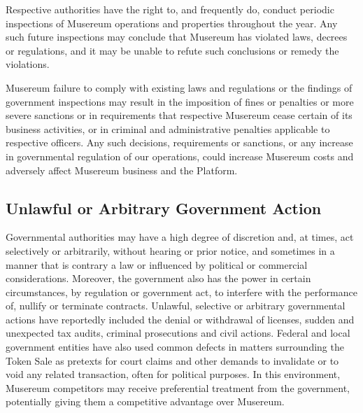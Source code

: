 \documentclass[12pt]{report}
\begin{document}
Respective authorities have the right to, and frequently do, conduct periodic inspections of Musereum operations and properties throughout the year. Any such future inspections may conclude that Musereum has violated laws, decrees or regulations, and it may be unable to refute such conclusions or remedy the violations.

Musereum failure to comply with existing laws and regulations or the findings of government inspections may result in the imposition of fines or penalties or more severe sanctions or in requirements that respective Musereum cease certain of its business activities, or in criminal and administrative penalties applicable to respective officers. Any such decisions, requirements or sanctions, or any increase in governmental regulation of our operations, could increase Musereum costs and adversely affect Musereum business and the Platform.


\subsection*{Unlawful or Arbitrary Government Action}
Governmental authorities may have a high degree of discretion and, at times, act selectively or arbitrarily, without hearing or prior notice, and sometimes in a manner that is contrary a law or influenced by political or commercial considerations. Moreover, the government also has the power in certain circumstances, by regulation or government act, to interfere with the performance of, nullify or terminate contracts. Unlawful, selective or arbitrary governmental actions have reportedly included the denial or withdrawal of licenses, sudden and unexpected tax audits, criminal prosecutions and civil actions. Federal and local government entities have also used common defects in matters surrounding the Token Sale as pretexts for court claims and other demands to invalidate or to void any related transaction, often for political purposes. In this environment, Musereum competitors may receive preferential treatment from the government, potentially giving them a competitive advantage over Musereum.

\end{document}

